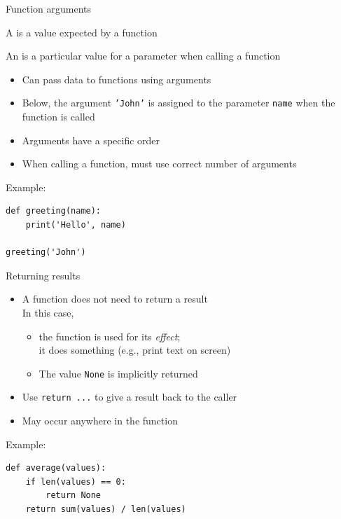 \documentclass[aspectratio=169,usenames,dvipsnames]{beamer}
\begin{document}
\begin{frame}[fragile]{Function arguments}
    \begin{definition}
        A  is a value expected by a function

        An  is a particular value for a parameter
            when calling a function
    \end{definition}

    \begin{itemize}
        \item Can pass data to functions using arguments
        \item Below, the argument \texttt{'John'} is assigned
            to the parameter \texttt{name} when the function is called
        \item Arguments have a specific order
        \item When calling a function, must use correct number of arguments
    \end{itemize}
Example:
\begin{lstlisting}
def greeting(name):
    print('Hello', name)

greeting('John')
\end{lstlisting}
\end{frame}

\begin{frame}[fragile]{Returning results}
    \begin{itemize}
        \item A function does not need to return a result \\
            In this case, 
            \begin{itemize}
                \item the function is used for its \emph{effect};\\
                    it does something (e.g., print text on screen)
                \item The value \texttt{None} is implicitly returned
            \end{itemize}
        \item Use \texttt{return ...} to give a result back to the caller
        \item May occur anywhere in the function
    \end{itemize}

Example:
\begin{lstlisting}
def average(values):
    if len(values) == 0:
        return None
    return sum(values) / len(values)
\end{lstlisting}
\end{frame}
\end{document}
